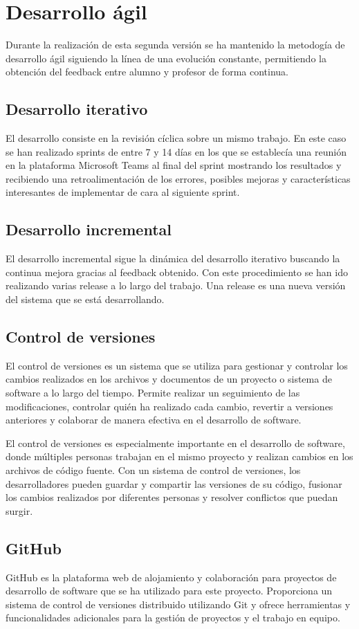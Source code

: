 \section{Desarrollo ágil}
Durante la realización de esta segunda versión se ha mantenido la metodogía de desarrollo ágil siguiendo la línea de una evolución constante, permitiendo la obtención del feedback entre alumno y profesor de forma continua.
\subsection{Desarrollo iterativo}
El desarrollo consiste en la revisión cíclica sobre un mismo trabajo. En este caso se han realizado sprints de entre 7 y 14 días en los que se establecía una reunión en la plataforma Microsoft Teams al final del sprint mostrando los resultados y recibiendo una retroalimentación de los errores, posibles mejoras y características interesantes de implementar de cara al siguiente sprint.
\subsection{Desarrollo incremental}
El desarrollo incremental sigue la dinámica del desarrollo iterativo buscando la continua mejora gracias al feedback obtenido. Con este procedimiento se han ido realizando varias release a lo largo del trabajo. Una release es una nueva versión del sistema que se está desarrollando\cite{releasedefinition}.
\subsection{Control de versiones}
El control de versiones es un sistema que se utiliza para gestionar y controlar los cambios realizados en los archivos y documentos de un proyecto o sistema de software a lo largo del tiempo. Permite realizar un seguimiento de las modificaciones, controlar quién ha realizado cada cambio, revertir a versiones anteriores y colaborar de manera efectiva en el desarrollo de software.

El control de versiones es especialmente importante en el desarrollo de software, donde múltiples personas trabajan en el mismo proyecto y realizan cambios en los archivos de código fuente. Con un sistema de control de versiones, los desarrolladores pueden guardar y compartir las versiones de su código, fusionar los cambios realizados por diferentes personas y resolver conflictos que puedan surgir.
\subsection{GitHub}
GitHub es la plataforma web de alojamiento y colaboración para proyectos de desarrollo de software que se ha utilizado para este proyecto. Proporciona un sistema de control de versiones distribuido utilizando Git y ofrece herramientas y funcionalidades adicionales para la gestión de proyectos y el trabajo en equipo.
